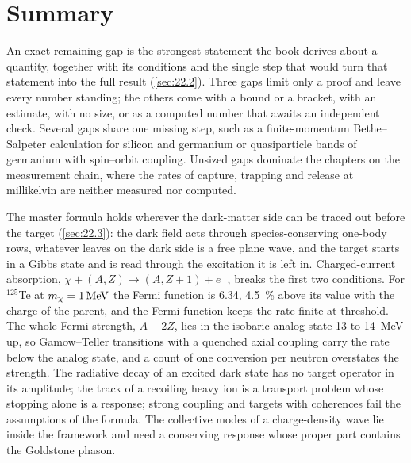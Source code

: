 \section*{Summary}

An exact remaining gap is the strongest statement the book derives about a quantity, together with its conditions and the single step that would turn that statement into the full result (\cref{sec:22.2}). Three gaps limit only a proof and leave every number standing; the others come with a bound or a bracket, with an estimate, with no size, or as a computed number that awaits an independent check. Several gaps share one missing step, such as a finite-momentum Bethe--Salpeter calculation for silicon and germanium or quasiparticle bands of germanium with spin--orbit coupling. Unsized gaps dominate the chapters on the measurement chain, where the rates of capture, trapping and release at millikelvin are neither measured nor computed.

The master formula holds wherever the dark-matter side can be traced out before the target (\cref{sec:22.3}): the dark field acts through species-conserving one-body rows, whatever leaves on the dark side is a free plane wave, and the target starts in a Gibbs state and is read through the excitation it is left in. Charged-current absorption, $\chi + (A, Z) \to (A, Z+1) + e^-$, breaks the first two conditions. For $^{125}$Te at $m_{\chi} = \SI{1}{MeV}$ the Fermi function is 6.34, \SI{4.5}{\percent} above its value with the charge of the parent, and the Fermi function keeps the rate finite at threshold. The whole Fermi strength, $A - 2Z$, lies in the isobaric analog state 13 to \SI{14}{MeV} up, so Gamow--Teller transitions with a quenched axial coupling carry the rate below the analog state, and a count of one conversion per neutron overstates the strength. The radiative decay of an excited dark state has no target operator in its amplitude; the track of a recoiling heavy ion is a transport problem whose stopping alone is a response; strong coupling and targets with coherences fail the assumptions of the formula. The collective modes of a charge-density wave lie inside the framework and need a conserving response whose proper part contains the Goldstone phason.

